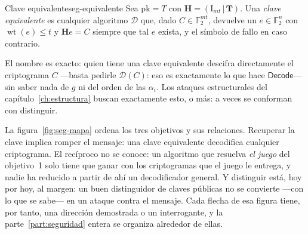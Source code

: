\documentclass[11pt,a4paper,oneside]{report}
\newcommand{\F}{\mathbb{F}}
\newcommand{\wt}{\operatorname{wt}}
\newcommand{\Hmat}{\mathbf{H}}          %
\newcommand{\Tmat}{\mathbf{T}}          %
\newcommand{\Ftwo}{\F_2}
\begin{document}
\begin{definicion}{Clave equivalente}{seg-equivalente}
Sea $\mathrm{pk}=T$ con $\Hmat=(\mathrm{I}_{mt}\,|\,\Tmat)$. Una
\emph{clave equivalente} es cualquier algoritmo $\mathcal{D}$ que,
dado $C\in\Ftwo^{mt}$, devuelve un $e\in\Ftwo^{n}$ con $\wt(e)\le t$
y $\Hmat e=C$ siempre que tal $e$ exista, y el símbolo de fallo en
caso contrario.
\end{definicion}

El nombre es exacto: quien tiene una clave equivalente descifra
directamente el criptograma $C$ ---basta pedirle $\mathcal{D}(C)$:
eso es exactamente lo que hace $\textsf{Decode}$--- sin saber nada
de $g$ ni del orden de las $\alpha_i$. Los ataques estructurales del
capítulo~\ref{ch:estructura} buscan exactamente esto, o más: a veces
se conforman con distinguir.

La figura~\ref{fig:seg-mapa} ordena los tres objetivos y sus
relaciones. Recuperar la clave implica romper el mensaje: una clave
equivalente decodifica cualquier criptograma. El recíproco no se
conoce: un algoritmo que resuelva \emph{el juego} del objetivo~1 solo
tiene que ganar con los criptogramas que el juego le entrega, y nadie
ha reducido a partir de ahí un decodificador general. Y distinguir
está, hoy por hoy, al margen: un buen distinguidor de claves públicas
no se convierte ---con lo que se sabe--- en un ataque contra el
mensaje. Cada flecha de esa figura tiene, por tanto, una dirección
demostrada o un interrogante, y la parte~\ref{part:seguridad} entera
se organiza alrededor de ellas.
\end{document}
